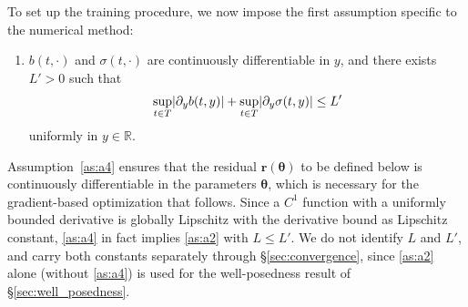 \documentclass[11pt, a4paper]{article}
\theoremstyle{theoremstyle}
\theoremstyle{definitionstyle}
\DeclarePairedDelimiter{\abs}{\lvert}{\rvert}
\begin{document}
To set up the training procedure, we now impose the first assumption specific to the numerical method:
\begin{enumerate}[resume=assumptions,label=(A\arabic*)]
    \item \label{as:a4} $b(t,\cdot)$ and $\sigma(t,\cdot)$ are continuously differentiable in $y$, and there exists $L' > 0$ such that
    \begin{equation}
        \sup_{t \in T} \abs{\partial_yb(t,y)}+ \sup_{t\in T} \abs{\partial_y\sigma(t,y)} \leq L'
    \end{equation}
    uniformly in $y \in \mathbb R$.
\end{enumerate}
Assumption~\ref{as:a4} ensures that the residual $\mathbf r(\boldsymbol \theta)$ to be defined below is continuously differentiable in the parameters $\boldsymbol \theta$, which is necessary for the gradient-based optimization that follows. Since a $C^1$ function with a uniformly bounded derivative is globally Lipschitz with the derivative bound as Lipschitz constant, \ref{as:a4} in fact implies \ref{as:a2} with $L \le L'$. We do not identify $L$ and $L'$, and carry both constants separately through \S\ref{sec:convergence}, since \ref{as:a2} alone (without \ref{as:a4}) is used for the well-posedness result of \S\ref{sec:well_posedness}.
\end{document}
